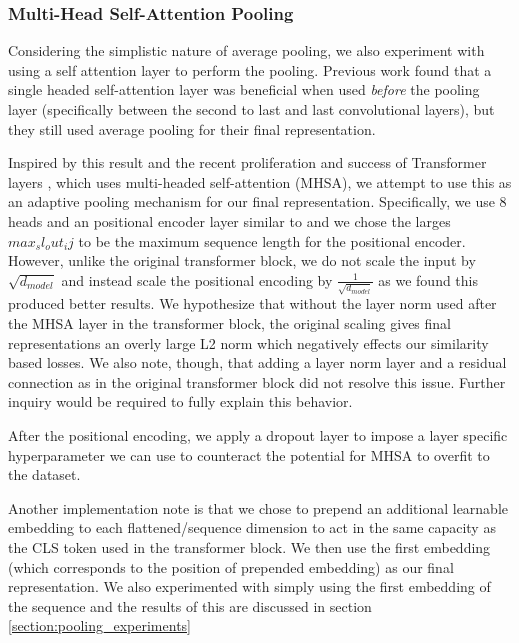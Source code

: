 \subsubsection{Multi-Head Self-Attention Pooling}
\label{section:mh_attn_pooling}
Considering the simplistic nature of average pooling, we also experiment with using a self attention layer to perform the pooling.
Previous work \citeme[Ohishi] found that a single headed self-attention layer was beneficial when used \textit{before} the pooling layer (specifically between the second to last and last convolutional layers), but they still used average pooling for their final representation.

Inspired by this result and the recent proliferation and success of Transformer layers \citeme, which uses multi-headed self-attention (MHSA), we attempt to use this as an adaptive pooling mechanism for our final representation.
Specifically, we use 8 heads and an positional encoder layer similar to \citeme and we chose the larges $max_sl_out_ij$ to be the maximum sequence length for the positional encoder.
However, unlike the original transformer block, we do not scale the input by $\sqrt{d_{model}}$ and instead scale the positional encoding by $\frac{1}{\sqrt{d_{model}}}$  as we found this produced better results.
We hypothesize that without the layer norm used after the MHSA layer in the transformer block, the original scaling gives final representations an overly large L2 norm which negatively effects our similarity based losses.
We also note, though, that adding a layer norm layer and a residual connection as in the original transformer block did not resolve this issue.
Further inquiry would be required to fully explain this behavior.

After the positional encoding, we apply a dropout layer to impose a layer specific hyperparameter we can use to counteract the potential for MHSA to overfit to the dataset.

Another implementation note is that we chose to prepend an additional learnable embedding to each flattened/sequence dimension to act in the same capacity as the CLS token used in the transformer block.
We then use the first embedding (which corresponds to the position of prepended embedding) as our final representation.
We also experimented with simply using the first embedding of the sequence and the results of this are discussed in section \ref{section:pooling_experiments}

